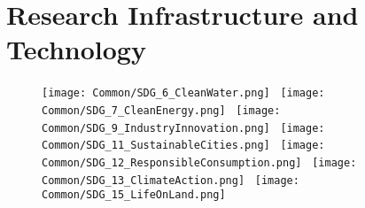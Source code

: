 \documentclass[../SustainableHEP.tex]{subfiles}
\begin{document}
\RaggedRight
\sloppy
\newpage


\section{Research Infrastructure and Technology}
\label{sec:Technology}


\begin{figure}
    \texttt{[image: Common/SDG\_6\_CleanWater.png]}~%
    \texttt{[image: Common/SDG\_7\_CleanEnergy.png]}~%
    \texttt{[image: Common/SDG\_9\_IndustryInnovation.png]}~%
    \texttt{[image: Common/SDG\_11\_SustainableCities.png]}~%
    \texttt{[image: Common/SDG\_12\_ResponsibleConsumption.png]}~%
    \texttt{[image: Common/SDG\_13\_ClimateAction.png]}~%
    \texttt{[image: Common/SDG\_15\_LifeOnLand.png]}
\end{figure}


\exSum
\end{document}
